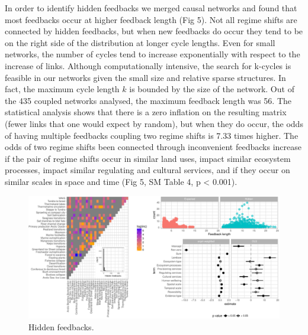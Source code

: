 \documentclass[9pt,]{article}
\begin{document}
In order to identify hidden feedbacks we merged causal networks and
found that most feedbacks occur at higher feedback length (Fig 5). Not
all regime shifts are connected by hidden feedbacks, but when new
feedbacks do occur they tend to be on the right side of the distribution
at longer cycle lengths. Even for small networks, the number of cycles
tend to increase exponentially with respect to the increase of links.
Although computationally intensive, the search for k-cycles is feasible
in our networks given the small size and relative sparse structures. In
fact, the maximum cycle length \(k\) is bounded by the size of the
network. Out of the 435 coupled networks analysed, the maximum feedback
length was 56. The statistical analysis shows that there is a zero
inflation on the resulting matrix (fewer links that one would expect by
random), but when they do occur, the odds of having multiple feedbacks
coupling two regime shifts is 7.33 times higher. The odds of two regime
shifts been connected through inconvenient feedbacks increase if the
pair of regime shifts occur in similar land uses, impact similar
ecosystem processes, impact similar regulating and cultural services,
and if they occur on similar scales in space and time (Fig 5, SM Table
4, p \textless{} 0.001).

\begin{figure}

{\centering \includegraphics{170417_draft_files/figure-latex/Fig5-1} 

}

\caption{Hidden feedbacks.}\label{fig:Fig5}
\end{figure}
\end{document}
